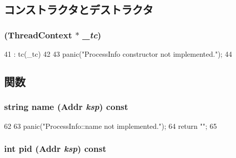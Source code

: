 \subsection{コンストラクタとデストラクタ}
\hypertarget{classPowerISA_1_1ProcessInfo_a9c31978febe8b0cc8e9e76eb6791312b}{
\subsubsection[{ProcessInfo}]{ ({\bf ThreadContext} $\ast$ {\em \_\-tc})}}
\label{classPowerISA_1_1ProcessInfo_a9c31978febe8b0cc8e9e76eb6791312b}



\begin{DoxyCode}
41     : tc(_tc)
42 {
43     panic("ProcessInfo constructor not implemented.\n");
44 }
\end{DoxyCode}


\subsection{関数}
\hypertarget{classPowerISA_1_1ProcessInfo_ae39ec1168c2ea31862bebf2afeda34d8}{
\subsubsection[{name}]{\setlength{\rightskip}{0pt plus 5cm}string name ({\bf Addr} {\em ksp}) const}}
\label{classPowerISA_1_1ProcessInfo_ae39ec1168c2ea31862bebf2afeda34d8}



\begin{DoxyCode}
62 {
63     panic("ProcessInfo::name not implemented.\n");
64     return "";
65 }
\end{DoxyCode}
\hypertarget{classPowerISA_1_1ProcessInfo_a27d14b3fdb576a4081e5c58c55375042}{
\subsubsection[{pid}]{\setlength{\rightskip}{0pt plus 5cm}int pid ({\bf Addr} {\em ksp}) const}}
\label{classPowerISA_1_1ProcessInfo_a27d14b3fdb576a4081e5c58c55375042}



